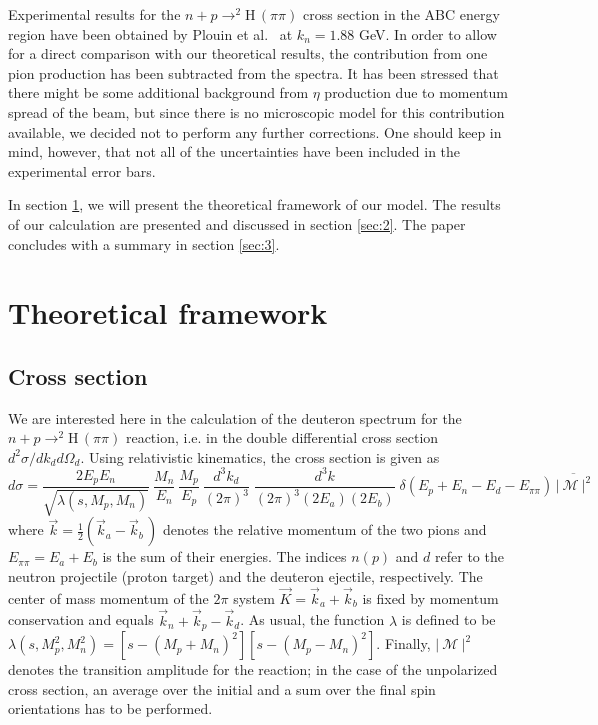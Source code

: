 Experimental results for the $n+p \to ^2$H$\, (\pi\pi)$ cross section 
in the ABC energy region have been 
obtained by Plouin et al.\ \cite{plouin78} at $k_n = 1.88$ GeV.
In order to allow for a direct comparison with our theoretical results,
the contribution from one pion production has been subtracted from the spectra.
It has been stressed that there might be some additional background 
from $\eta$ production \cite{plouin90} due to momentum spread of the beam, but
since there is no microscopic model for this contribution available,
we decided not to perform any further corrections.
One should keep in mind, however, that not all of the 
uncertainties have been included in the experimental error bars.

In section \ref{sec:1}, we will present the theoretical framework of our model.
The results of our calculation are presented and discussed
in section \ref{sec:2}. The paper concludes with a summary in section \ref{sec:3}.




\section{Theoretical framework}
\label{sec:1}

\subsection{Cross section}

We are interested here in the calculation of the deuteron spectrum for 
the $n+p \to ^2$H$\, (\pi\pi)$ reaction, i.e. in the double differential
cross section $d^2 \sigma / dk_d d\Omega_d$. Using relativistic kinematics,
the cross section is given as
%  
\begin{equation}
  \label{eq:1}
  d \sigma = \frac{2 E_p E_n}{\sqrt{\lambda(s,M_p,M_n)}} \: \frac{M_n}{E_n} \:
  \frac{M_p}{E_p} \: \frac{d^3 k_d}{(2 \pi)^3} \; 
  \frac{d^3 k}{(2\pi)^3 (2E_a)(2 E_b)} \; \delta(E_p + E_n - E_d - E_{\pi\pi})
  \, \overline{\bigl| \: {\mathcal M} \: \bigr| ^{2}}
\end{equation}
%
where $\vec k = \frac{1}{2} (\vec k_a - \vec k_b \,)$ denotes the relative
momentum of the two pions and $E_{\pi\pi} = E_a + E_b$ is the sum of their energies. 
The indices $n(p)$ and $d$ refer to the neutron projectile (proton target)
and the deuteron ejectile, respectively. The center of mass momentum of 
the $2\pi$ system $\vec K = \vec k_a + \vec k_b$ is fixed by momentum
conservation and equals $\vec k_n + \vec k_p - \vec k_d$. 
As usual, the function $\lambda$ is defined to be $\lambda(s,M_p^2,M_n^2) = 
\left[ s-(M_p+M_n)^2 \right] \left[ s-(M_p-M_n)^2 \right]$.
Finally, $| \: {\mathcal M} \: | ^{2}$ denotes the transition amplitude 
for the reaction; 
in the case of the unpolarized cross section, an average over the initial 
and a sum over the final spin orientations has to be performed.

